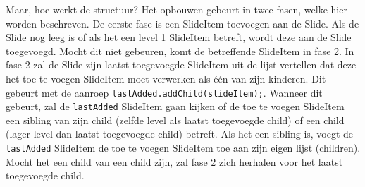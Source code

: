 \documentclass[a4paper]{article}
\newcommand{\1}[0]{\'{e}\'{e}n}
\newcommand{\code}[1]{\texttt{#1}}
\begin{document}
Maar, hoe werkt de structuur? Het opbouwen gebeurt in twee fasen, welke hier worden beschreven. De eerste fase is een SlideItem toevoegen aan de Slide. Als de Slide nog leeg is of als het een level 1 SlideItem betreft, wordt deze aan de Slide toegevoegd. Mocht dit niet gebeuren, komt de betreffende SlideItem in fase 2. In fase 2 zal de Slide zijn laatst toegevoegde SlideItem uit de lijst vertellen dat deze het toe te voegen SlideItem moet verwerken als \1 van zijn kinderen. Dit gebeurt met de aanroep \code{lastAdded.addChild(slideItem);}. Wanneer dit gebeurt, zal de \code{lastAdded} SlideItem gaan kijken of de toe te voegen SlideItem een sibling van zijn child (zelfde level als laatst toegevoegde child) of een child (lager level dan laatst toegevoegde child) betreft. Als het een sibling is, voegt de \code{lastAdded} SlideItem de toe te voegen SlideItem toe aan zijn eigen lijst (children). Mocht het een child van een child zijn, zal fase 2 zich herhalen voor het laatst toegevoegde child.
\end{document}
